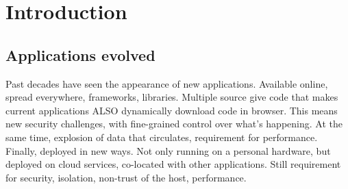 \section{Introduction}

%	
%	

\subsection{Applications evolved}
Past decades have seen the appearance of new applications.
Available online, spread everywhere, frameworks, libraries.
Multiple source give code that makes current applications ALSO dynamically download code in browser.
This means new security challenges, with fine-grained control over what's happening.
At the same time, explosion of data that circulates, requirement for performance.
Finally, deployed in new ways. Not only running on a personal hardware, but deployed on cloud services, co-located with other applications.
Still requirement for security, isolation, non-trust of the host, performance.\\


